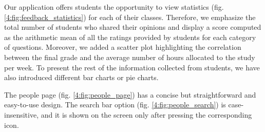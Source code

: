     Our application offers students the opportunity to view statistics (fig. \ref{4:fig:feedback_statistics}) for each of their classes. Therefore, we emphasize the total number of students who shared their opinions and display a score computed as the arithmetic mean of all the ratings provided by students for each category of questions. Moreover, we added a scatter plot highlighting the correlation between the final grade and the average number of hours allocated to the study per week. To present the rest of the information collected from students, we have also introduced different bar charts or pie charts.
    
    The people page (fig. \ref{4:fig:people_page}) has a concise but straightforward and easy-to-use design. The search bar option (fig. \ref{4:fig:people_search}) is case-insensitive, and it is shown on the screen only after pressing the corresponding icon.
    